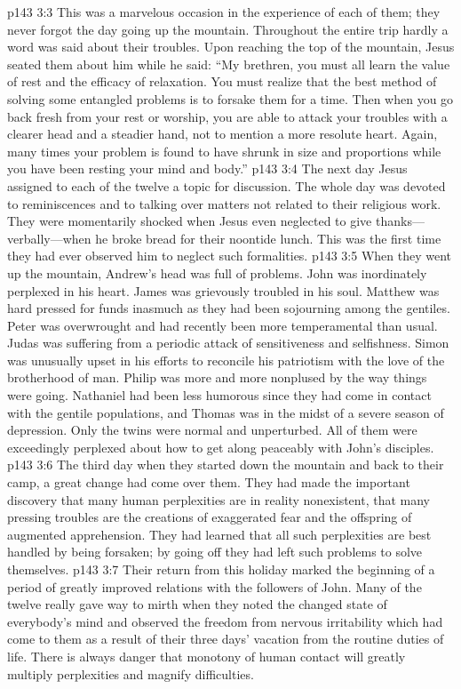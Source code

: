 \pc \vs p143 3:3 This was a marvelous occasion in the experience of each of them; they never forgot the day going up the mountain. Throughout the entire trip hardly a word was said about their troubles. Upon reaching the top of the mountain, Jesus seated them about him while he said: \textcolor{ubdarkred}{“My brethren, you must all learn the value of rest and the efficacy of relaxation. You must realize that the best method of solving some entangled problems is to forsake them for a time. Then when you go back fresh from your rest or worship, you are able to attack your troubles with a clearer head and a steadier hand, not to mention a more resolute heart. Again, many times your problem is found to have shrunk in size and proportions while you have been resting your mind and body.”}
\vs p143 3:4 The next day Jesus assigned to each of the twelve a topic for discussion. The whole day was devoted to reminiscences and to talking over matters not related to their religious work. They were momentarily shocked when Jesus even neglected to give thanks---verbally---when he broke bread for their noontide lunch. This was the first time they had ever observed him to neglect such formalities.
\vs p143 3:5 When they went up the mountain, Andrew’s head was full of problems. John was inordinately perplexed in his heart. James was grievously troubled in his soul. Matthew was hard pressed for funds inasmuch as they had been sojourning among the gentiles. Peter was overwrought and had recently been more temperamental than usual. Judas was suffering from a periodic attack of sensitiveness and selfishness. Simon was unusually upset in his efforts to reconcile his patriotism with the love of the brotherhood of man. Philip was more and more nonplused by the way things were going. Nathaniel had been less humorous since they had come in contact with the gentile populations, and Thomas was in the midst of a severe season of depression. Only the twins were normal and unperturbed. All of them were exceedingly perplexed about how to get along peaceably with John’s disciples.
\vs p143 3:6 The third day when they started down the mountain and back to their camp, a great change had come over them. They had made the important discovery that many human perplexities are in reality nonexistent, that many pressing troubles are the creations of exaggerated fear and the offspring of augmented apprehension. They had learned that all such perplexities are best handled by being forsaken; by going off they had left such problems to solve themselves.
\vs p143 3:7 Their return from this holiday marked the beginning of a period of greatly improved relations with the followers of John. Many of the twelve really gave way to mirth when they noted the changed state of everybody’s mind and observed the freedom from nervous irritability which had come to them as a result of their three days’ vacation from the routine duties of life. There is always danger that monotony of human contact will greatly multiply perplexities and magnify difficulties.\plusone
